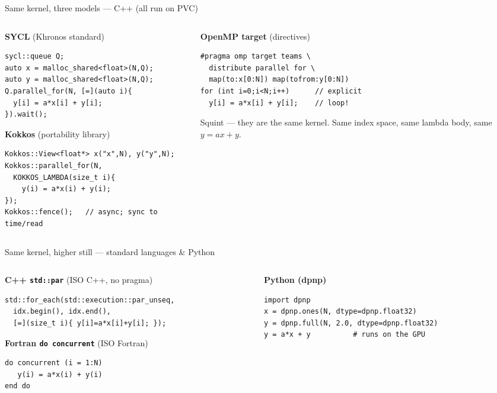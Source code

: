\begin{frame}[fragile]{Same kernel, three models --- C++ (all run on PVC)}
\begin{columns}[T]
\begin{column}{0.5\textwidth}
\textbf{SYCL} \footnotesize(Khronos standard)
\begin{verbatim}
sycl::queue Q;
auto x = malloc_shared<float>(N,Q); 
auto y = malloc_shared<float>(N,Q); 
Q.parallel_for(N, [=](auto i){
  y[i] = a*x[i] + y[i];
}).wait();
\end{verbatim}
\textbf{Kokkos} \footnotesize(portability library)
\begin{verbatim}
Kokkos::View<float*> x("x",N), y("y",N);
Kokkos::parallel_for(N,
  KOKKOS_LAMBDA(size_t i){
    y(i) = a*x(i) + y(i);
});
Kokkos::fence();   // async; sync to time/read
\end{verbatim}
\end{column}
\begin{column}{0.5\textwidth}
\textbf{OpenMP target} \footnotesize(directives)
\begin{verbatim}
#pragma omp target teams \
  distribute parallel for \
  map(to:x[0:N]) map(tofrom:y[0:N])
for (int i=0;i<N;i++)      // explicit
  y[i] = a*x[i] + y[i];    // loop!
\end{verbatim}
\alert{Squint --- they are the same kernel.}
Same index space, same lambda body, same
$y = a x + y$.
\end{column}
\end{columns}
\end{frame}

\begin{frame}[fragile]{Same kernel, higher still --- standard languages \& Python}
\begin{columns}[T]
\begin{column}{0.52\textwidth}
\textbf{C++ \texttt{std::par}} \footnotesize(ISO C++, no pragma)
\begin{verbatim}
std::for_each(std::execution::par_unseq,
  idx.begin(), idx.end(),
  [=](size_t i){ y[i]=a*x[i]+y[i]; });
\end{verbatim}
\textbf{Fortran \texttt{do concurrent}} \footnotesize(ISO Fortran)
\begin{verbatim}
do concurrent (i = 1:N)
   y(i) = a*x(i) + y(i)
end do
\end{verbatim}
\end{column}
\begin{column}{0.48\textwidth}
\textbf{Python (dpnp)}
\begin{verbatim}
import dpnp
x = dpnp.ones(N, dtype=dpnp.float32)
y = dpnp.full(N, 2.0, dtype=dpnp.float32)
y = a*x + y          # runs on the GPU
\end{verbatim}
\footnotesize

\end{column}
\end{columns}
\end{frame}

